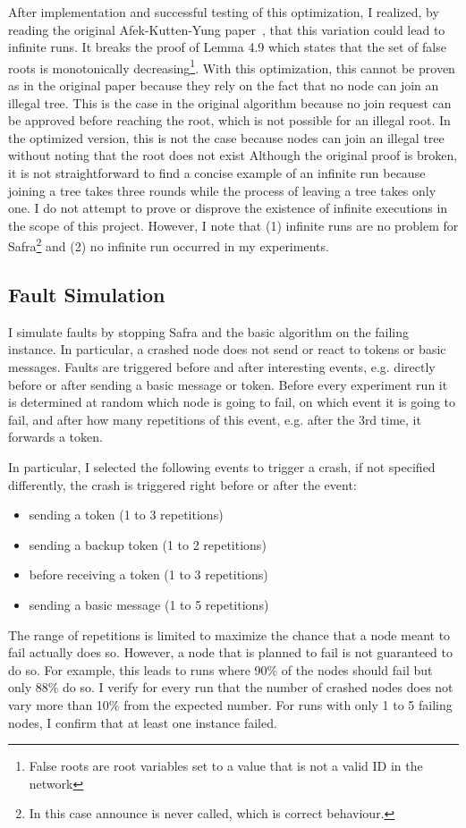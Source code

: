 After implementation and successful testing of this optimization, I realized, by reading the original Afek-Kutten-Yung paper~\cite{afek}, that this variation could lead to infinite runs.
It breaks the proof of Lemma 4.9 which states that the set of false roots is monotonically decreasing\footnote{False roots are root variables set to a value that is not a valid ID in the network}.
With this optimization, this cannot be proven as in the original paper because they rely on the fact that no node can join an illegal tree.
This is the case in the original algorithm because no join request can be approved before reaching the root, which is not possible for an illegal root.
In the optimized version, this is not the case because nodes can join an illegal tree without noting that the root does not exist
Although the original proof is broken, it is not straightforward to find a concise example of an infinite run because joining a tree takes three rounds while the process of leaving a tree takes only one.
I do not attempt to prove or disprove the existence of infinite executions in the scope of this project.
However, I note that (1) infinite runs are no problem for Safra\footnote{In this case announce is never called, which is correct behaviour.} and (2) no infinite run occurred in my experiments.

\subsection{Fault Simulation}
I simulate faults by stopping Safra and the basic algorithm on the failing instance.
In particular, a crashed node does not send or react to tokens or basic messages.
Faults are triggered before and after interesting events, e.g. directly before or after sending a basic message or token.
Before every experiment run it is determined at random which node is going to fail, on which event it is going to fail, and after how many repetitions of this event, e.g. after the 3rd time, it forwards a token.

In particular, I selected the following events to trigger a crash, if not specified differently, the crash is triggered right before or after the event:
\begin{itemize}
    \item sending a token (1 to 3 repetitions)
    \item sending a backup token (1 to 2 repetitions)
    \item before receiving a token (1 to 3 repetitions)
    \item sending a basic message (1 to 5 repetitions)
\end{itemize}
The range of repetitions is limited to maximize the chance that a node meant to fail actually does so.
However, a node that is planned to fail is not guaranteed to do so.
For example, this leads to runs where 90\% of the nodes should fail but only 88\% do so.
I verify for every run that the number of crashed nodes does not vary more than 10\% from the expected number. For runs with only 1 to 5 failing nodes, I confirm that at least one instance failed.

